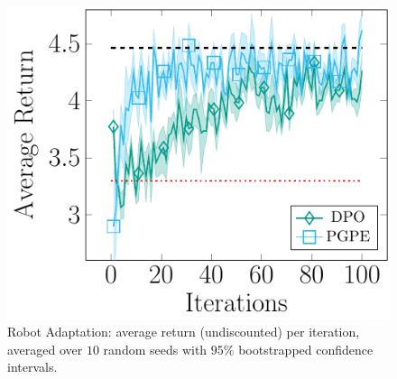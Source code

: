\begin{figure}[t]
	\includegraphics[width=\textwidth]{plots/recover.pdf}
	\caption{Robot Adaptation: average return (undiscounted) per iteration, averaged over $10$ random seeds with $95\%$ bootstrapped confidence intervals.}
	\label{fig:recover}
\end{figure}

